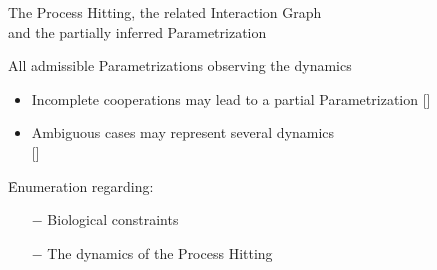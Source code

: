 \begin{frame}
\begin{columns}
\begin{column}{0.25\textwidth}
\end{column}
\end{columns}

\bigskip
{} The Process Hitting, the related Interaction Graph\\
\quad \quad and the partially inferred Parametrization

 All admissible Parametrizations observing the dynamics

\smallskip
\pause[2]
\begin{itemize}
  \item Incomplete cooperations may lead to a partial Parametrization []
\pause[3]
  \item Ambiguous cases may represent several dynamics\\\hfill[]
\end{itemize}

\pause[4]
\f Enumeration regarding:
\begin{itemize}
  \item[$-$] Biological constraints
  \item[$-$] The dynamics of the Process Hitting
\end{itemize}
\end{frame}



\begin{comment}
\begin{frame}[c]
  \frametitle{Abducing Parametrizations}
  \framesubtitle{Implementation}

Parameters definitions:

\quad One identifier for each parameter: \ex{$param\_label(a, i)$}

\bigskip

Useful rules:

\quad $\ex{less\_active(X, P, Q) \leftarrow~} K_{X,P}\text{ has less activators than }K_{X,Q}$

\quad $\ex{param\_inf(X, P, Q) \leftarrow~} K_{X,P} \preccurlyeq K_{X,Q}$

\pause
\bigskip
Parameters enumeration uses cardinalities:

\quad \ex{$1~\{~param(X, P, I) : component\_levels(X, I)~\} \leftarrow param\_label(X, P).$}

\console{[$X$: component; $P$: parameter label; $I$: parameter value]}

\pause
\bigskip
Parametrizations filtering uses constraints:

\quad \ex{$\leftarrow less\_active(X, P, Q), \neg param\_inf(X, P, Q).$}

\console{[$X$: component; $P$, $Q$: parameter labels]}

\end{frame}
\end{comment}



